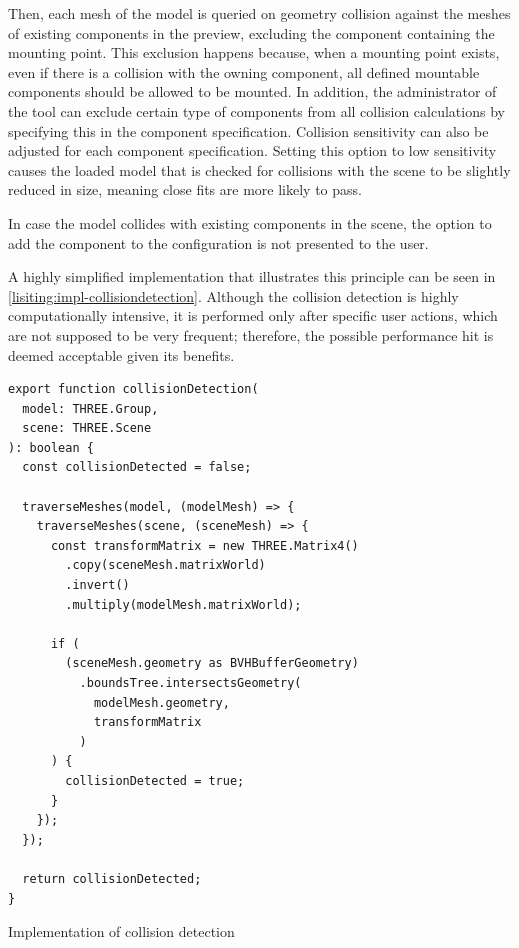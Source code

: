 Then, each mesh of the model is queried on geometry collision against the meshes of existing components in the preview, excluding the component containing the mounting point. This exclusion happens because, when a mounting point exists, even if there is a collision with the owning component, all defined mountable components should be allowed to be mounted. In addition, the administrator of the tool can exclude certain type of components from all collision calculations by specifying this in the component specification. Collision sensitivity can also be adjusted for each component specification. Setting this option to low sensitivity causes the loaded model that is checked for collisions with the scene to be slightly reduced in size, meaning close fits are more likely to pass.

In case the model collides with existing components in the scene, the option to add the component to the configuration is not presented to the user.

A highly simplified implementation that illustrates this principle can be seen in \autoref{lisiting:impl-collisiondetection}. Although the collision detection is highly computationally intensive, it is performed only after specific user actions, which are not supposed to be very frequent; therefore, the possible performance hit is deemed acceptable given its benefits.

\begin{listing}[h]
\begin{verbatim}
export function collisionDetection(
  model: THREE.Group,
  scene: THREE.Scene
): boolean {
  const collisionDetected = false;

  traverseMeshes(model, (modelMesh) => {
    traverseMeshes(scene, (sceneMesh) => {
      const transformMatrix = new THREE.Matrix4()
        .copy(sceneMesh.matrixWorld)
        .invert()
        .multiply(modelMesh.matrixWorld);

      if (
        (sceneMesh.geometry as BVHBufferGeometry)
          .boundsTree.intersectsGeometry(
            modelMesh.geometry,
            transformMatrix
          )
      ) {
        collisionDetected = true;
      }
    });
  });

  return collisionDetected;
}
\end{verbatim}
\caption{Implementation of collision detection}
\label{lisiting:impl-collisiondetection}
\end{listing}


